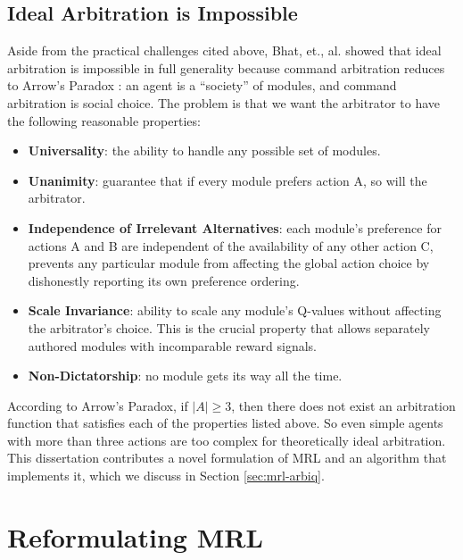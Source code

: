 \subsection{Ideal Arbitration is Impossible}

Aside from the practical challenges cited above, Bhat, et., al.  \cite{bhat2006on-the-difficulty} showed that ideal arbitration is impossible in full generality because command arbitration reduces to Arrow's Paradox \cite{arrow1963social}: an agent is a ``society'' of modules, and command arbitration is social choice.  The problem is that we want the arbitrator to have the following reasonable properties:

\begin{itemize}

\item \textbf{Universality}: the ability to handle any possible set of
  modules.

\item \textbf{Unanimity}: guarantee that if every module prefers
  action A, so will the arbitrator.

\item \textbf{Independence of Irrelevant Alternatives}: each
  module's preference for actions A and B are independent of the
  availability of any other action C, prevents any particular
  module from affecting the global action choice by dishonestly
  reporting its own preference ordering.

\item \textbf{Scale Invariance}: ability to scale any module's
  Q-values without affecting the arbitrator's choice.  This is the
  crucial property that allows separately authored modules with
  incomparable reward signals.

\item \textbf{Non-Dictatorship}: no module gets its way all the time.

\end{itemize}

According to Arrow's Paradox, if $|A|\geq 3$, then there does not exist an arbitration function that satisfies each of the properties listed above.  So even simple agents with more than three actions are too complex for theoretically ideal arbitration.  This dissertation contributes a novel formulation of MRL and an algorithm that implements it, which we discuss in Section \ref{sec:mrl-arbiq}.

\section{Reformulating MRL}

